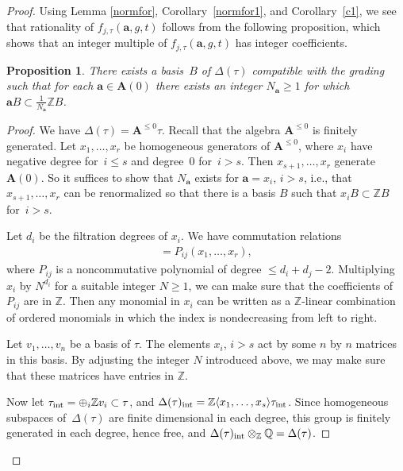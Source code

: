 \documentclass[pdftex]{sigma}
\numberwithin{equation}{section}
\newtheorem{Proposition}[Theorem]{Proposition}
\begin{document}
\begin{proof}
Using Lemma \ref{normfor}, Corollary~\ref{normfor1}, and Corollary~\ref{c1}, we see that rationality of $f_{j,\tau}({\mathbf a},g,t)$ follows from the following proposition, which shows that an integer multiple of $f_{j,\tau}({\mathbf a},g,t)$ has integer coefficients.

\begin{Proposition}\label{pr1} There exists a basis~$B$ of $\Delta(\tau)$ compatible with the grading such that for each ${\mathbf a}\in {\mathbf A}(0)$ there exists an integer $N_{{\mathbf a}}\ge 1$ for which ${\mathbf a} B\subset \frac{1}{N_{{\mathbf a}}}{\mathbb Z} B$.
\end{Proposition}

\begin{proof} We have $\Delta(\tau)={\mathbf A}^{\le 0}\tau$. Recall that the algebra ${\mathbf A}^{\le 0}$ is finitely generated. Let $x_1,\dots,x_r$ be homogeneous generators of ${\mathbf A}^{\le 0}$, where $x_i$ have negative degree for~\mbox{$i\le s$} and degree~$0$ for~\mbox{$i>s$}. Then $x_{s+1},\dots,x_r$ generate ${\mathbf A}(0)$. So it suffices to show that $N_{{\mathbf a}}$ exists for ${\mathbf a}=x_i$, $i>s$, i.e., that $x_{s+1},\dots,x_r$ can be renormalized so that there is a basis $B$ such that $x_iB\subset {\mathbb Z} B$ for~\mbox{$i>s$}.

Let $d_i$ be the filtration degrees of $x_i$. We have commutation relations
\begin{gather*}
[x_i,x_j]=P_{ij}(x_1,\dots,x_r),
\end{gather*}
where $P_{ij}$ is a noncommutative polynomial of degree $\le d_i+d_j-2$. Multiplying
$x_i$ by $N^{d_i}$ for a suitable integer $N\ge 1$, we can make sure that the coefficients of $P_{ij}$
are in ${\mathbb Z}$. Then any monomial in $x_i$ can be written as a ${\mathbb Z}$-linear combination of ordered monomials in which the index is nondecreasing from left to right.

Let $v_1,\dots,v_n$ be a basis of $\tau$. The elements $x_i$, $i>s$ act by some $n$ by $n$ matrices in this basis. By adjusting the integer $N$ introduced above, we may make sure that these matrices have entries in ${\mathbb Z}$.

Now let $\tau_{\rm int}=\oplus_i {\mathbb Z}v_i\subset \tau$, and $\Delta(\tau)_{\rm int}={\mathbb Z}\langle x_1,\dots,x_s\rangle \tau_{\rm int}$. Since homogeneous subspaces of~$\Delta(\tau)$ are finite dimensional in each degree, this group is finitely generated in each degree, hence free, and $\Delta(\tau)_{\rm int}\otimes_{{\mathbb Z}}{\mathbb Q}=\Delta(\tau)$.


\end{proof}
\end{proof}
\end{document}
